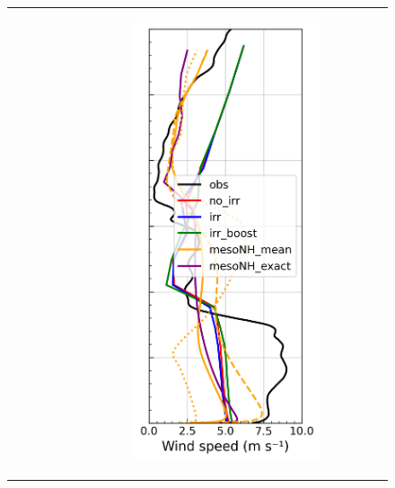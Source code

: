 \begin{figure}[hbtp]
{\begin{tabular}{@{}cccc@{}}
\begin{subfigure}[t]{0.283\textwidth}
        \end{subfigure} &
        \begin{subfigure}[t]{0.283\textwidth}
            \caption{}
            \includegraphics[width=\textwidth]{images/chap5/profiles/profile_elsplans_wind_speed_2007_sensbins.png}

\end{subfigure}
\end{tabular}}
\end{figure}
